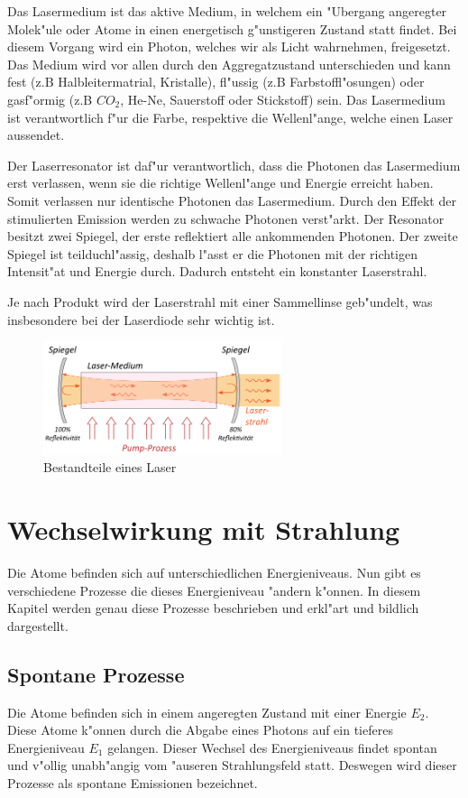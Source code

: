 \begin{refsection}
Das Lasermedium ist das aktive Medium, in welchem ein "Ubergang angeregter 
Molek"ule oder Atome in einen energetisch g"unstigeren Zustand statt findet. 
Bei diesem Vorgang wird ein Photon, welches wir als Licht wahrnehmen, 
freigesetzt. Das Medium wird vor allen durch den Aggregatzustand 
unterschieden und kann fest (z.B Halbleitermatrial, Kristalle), fl"ussig (z.B 
Farbstoffl"osungen) oder gasf"ormig (z.B $CO_{2}$, He-Ne, Sauerstoff oder 
Stickstoff) sein. Das Lasermedium ist verantwortlich f"ur die Farbe, 
respektive die Wellenl"ange, welche einen Laser aussendet.

Der Laserresonator ist daf"ur verantwortlich, dass die Photonen das 
Lasermedium erst verlassen, wenn sie die richtige Wellenl"ange und Energie 
erreicht haben. Somit verlassen nur identische Photonen das Lasermedium. 
Durch den Effekt der stimulierten Emission werden zu schwache Photonen 
verst"arkt. Der Resonator besitzt zwei Spiegel, der erste reflektiert alle 
ankommenden Photonen. Der zweite Spiegel ist teilduchl"assig, deshalb l"asst 
er die Photonen mit der richtigen Intensit"at und Energie durch. Dadurch 
entsteht ein konstanter Laserstrahl.

Je nach Produkt wird der Laserstrahl mit einer Sammellinse geb"undelt, was 
insbesondere bei der Laserdiode sehr wichtig ist.

\begin{figure}
\center
\includegraphics[width=7cm]{laser/bilder/aufbau.png}
\caption{Bestandteile eines Laser \cite{Aufbau}}
\label{Laser Aufbau}
\end{figure}


\section{Wechselwirkung mit Strahlung}
\label{Wechselwirkung}
Die Atome befinden sich auf unterschiedlichen Energieniveaus. 
Nun gibt es verschiedene Prozesse die dieses Energieniveau "andern k"onnen.
In diesem Kapitel werden genau diese Prozesse beschrieben und erkl"art und
bildlich dargestellt.


\subsection{Spontane Prozesse}
\label{Spontane Prozesse}
Die Atome befinden sich in einem angeregten Zustand mit einer Energie $E_2$. 
Diese Atome k"onnen durch die Abgabe eines Photons auf ein tieferes
Energieniveau $E_1$ gelangen.
Dieser Wechsel des Energieniveaus findet spontan und v"ollig unabh"angig vom
"auseren Strahlungsfeld statt.
Deswegen wird dieser Prozesse als spontane Emissionen bezeichnet.


\end{refsection}
